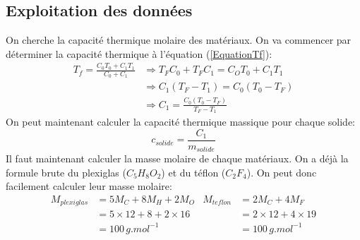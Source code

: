 \documentclass[12pt]{article}
\begin{document}
\subsection{Exploitation des données}
On cherche la capacité thermique molaire des matériaux. On va commencer par déterminer la capacité thermique  à l'équation (\ref{EquationTf}):
\begin{align*}
T_f=\frac{C_0T_0+C_1T_1}{C_0+C_1} &\Rightarrow T_FC_0+T_FC_1=C_OT_0+C_1T_1 \\
&\Rightarrow C_1(T_F-T_1)=C_0(T_0-T_F) \\
&\Rightarrow C_1=\frac{C_0(T_0-T_F)}{T_F-T_1}
\end{align*}
On peut maintenant calculer la capacité thermique massique pour chaque solide:
\begin{equation}
c_{solide}=\frac{C_1}{m_{solide}}
\end{equation}
Il faut maintenant calculer la masse molaire de chaque matériaux. On a déjà la formule brute du plexiglas ($C_5H_8O_2$) et du téflon ($C_2F_4$). On peut donc facilement calculer leur masse molaire:
\begin{align*}
M_{plexiglas}&=5M_C+8M_H+2M_O & M_{teflon}&=2M_C+4M_F  \\
&=5\times 12+8+2\times 16 & &=2\times 12+4\times 19 \\
&=100\, g.mol^{-1} & &=100\, g.mol^{-1}
\end{align*}
\end{document}
